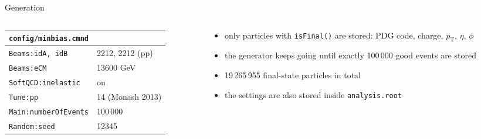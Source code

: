 \documentclass[aspectratio=169,11pt]{beamer}
\newcommand{\pt}{\ensuremath{p_\mathrm{T}}}
\begin{document}
\begin{frame}{Generation}
  \begin{columns}[T]
    \begin{column}{0.48\textwidth}
      \small
      \begin{tabular}{ll}
        \toprule
        \multicolumn{2}{l}{\texttt{config/minbias.cmnd}} \\
        \midrule
        \texttt{Beams:idA, idB}         & 2212, 2212 (pp) \\
        \texttt{Beams:eCM}              & 13600 GeV \\
        \texttt{SoftQCD:inelastic}      & on \\
        \texttt{Tune:pp}                & 14 (Monash 2013) \\
        \texttt{Main:numberOfEvents}    & 100\,000 \\
        \texttt{Random:seed}            & 12345 \\
        \bottomrule
      \end{tabular}
    \end{column}
    \begin{column}{0.48\textwidth}
      \begin{itemize}
        \item only particles with \texttt{isFinal()} are stored: PDG code, charge, \pt, $\eta$, $\phi$
        \item the generator keeps going until exactly 100\,000 good events are stored
        \item 19\,265\,955 final-state particles in total
        \item the settings are also stored inside \texttt{analysis.root}
      \end{itemize}
    \end{column}
  \end{columns}
\end{frame}
\end{document}
